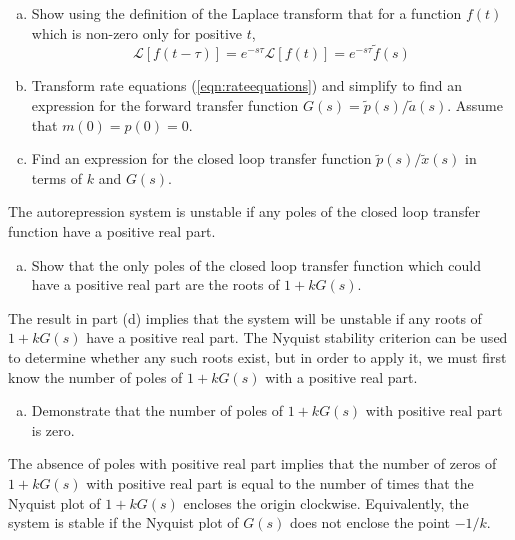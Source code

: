 \documentclass{article}
\begin{document}
\begin{enumerate}[a)]
\setlength{\itemsep}{0pt}
\item Show using the definition of the Laplace transform that for a function $f(t)$ which is non-zero only for positive $t$,
\[ \mathcal{L}\left[f(t-\tau)\right] = e^{-s\tau} \mathcal{L}\left[f(t)\right] = e^{-s\tau} \tilde{f}(s)\]
\item Transform rate equations (\ref{eqn:rateequations}) and simplify to find an expression for the forward transfer \linebreak  function $G(s) =\tilde{p}(s)/\tilde{a}(s)$. Assume that $m(0)=p(0)=0$.
\item Find an expression for the closed loop transfer function $\tilde{p}(s)/\tilde{x}(s)$ in terms of $k$ and $G(s)$.
\end{enumerate}
The autorepression system is unstable if any poles of the closed loop transfer function have a positive real part.
\begin{enumerate}[a)]
\setlength{\itemsep}{0pt}
\setcounter{enumi}{3}
\item Show that the only poles of the closed loop transfer function which could have a positive real part are the roots of $1 + kG(s)$.
\end{enumerate}
The result in part (d) implies that the system will be unstable if any roots of $1 + kG(s)$ have a positive real part. The Nyquist stability criterion can be used to determine whether any such roots exist, but in order to apply it, we must first know the number of poles of $1 + kG(s)$ with a positive real part.
\begin{enumerate}[a)]
\setlength{\itemsep}{0pt}
\setcounter{enumi}{4}
\item Demonstrate that the number of poles of $1 + kG(s)$ with positive real part is zero.
\end{enumerate}
The absence of poles with positive real part implies that the number of zeros of $1 + kG(s)$ with positive real part is equal to the number of times that the Nyquist plot of $1 + kG(s)$ encloses the origin clockwise. Equivalently, the system is stable if the Nyquist plot of $G(s)$ does not enclose the point $-1/k$.
\end{document}
